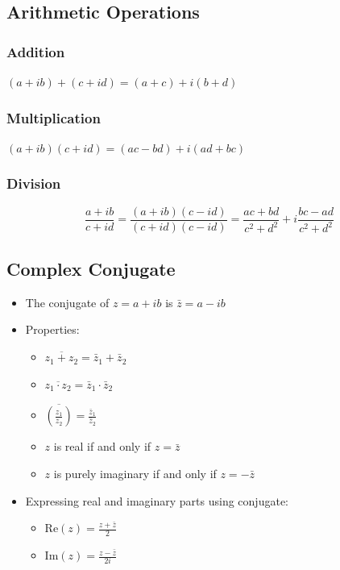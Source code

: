 \documentclass[
]{book}
\providecommand{\tightlist}{%
  \setlength{\itemsep}{0pt}\setlength{\parskip}{0pt}}
\theoremstyle{definition}
\theoremstyle{definition}
\theoremstyle{definition}
\theoremstyle{definition}
\theoremstyle{remark}
\begin{document}
\subsection{Arithmetic Operations}\label{arithmetic-operations}

\subsubsection{Addition}\label{addition}

\((a + ib) + (c + id) = (a + c) + i(b + d)\)

\subsubsection{Multiplication}\label{multiplication}

\((a + ib)(c + id) = (ac - bd) + i(ad + bc)\)

\subsubsection{Division}\label{division}

\[\frac{a + ib}{c + id} = \frac{(a + ib)(c - id)}{(c + id)(c - id)} = \frac{ac + bd}{c^2 + d^2} + i\frac{bc - ad}{c^2 + d^2}\]

\subsection{Complex Conjugate}\label{complex-conjugate}

\begin{itemize}
\tightlist
\item
  The conjugate of \(z = a + ib\) is \(\bar{z} = a - ib\)
\item
  Properties:

  \begin{itemize}
  \tightlist
  \item
    \(\overline{z_1 + z_2} = \bar{z}_1 + \bar{z}_2\)
  \item
    \(\overline{z_1 \cdot z_2} = \bar{z}_1 \cdot \bar{z}_2\)
  \item
    \(\overline{\left(\frac{z_1}{z_2}\right)} = \frac{\bar{z}_1}{\bar{z}_2}\)
  \item
    \(z\) is real if and only if \(z = \bar{z}\)
  \item
    \(z\) is purely imaginary if and only if \(z = -\bar{z}\)
  \end{itemize}
\item
  Expressing real and imaginary parts using conjugate:

  \begin{itemize}
  \tightlist
  \item
    \(\text{Re}(z) = \frac{z + \bar{z}}{2}\)
  \item
    \(\text{Im}(z) = \frac{z - \bar{z}}{2i}\)
  \end{itemize}
\end{itemize}
\end{document}
